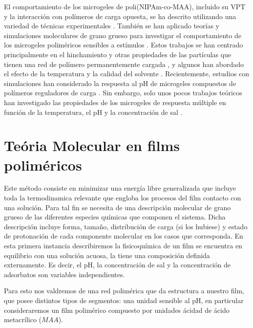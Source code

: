 El comportamiento de los microgeles de poli(NIPAm-co-MAA), incluido su VPT y la interacci\'on con pol\'imeros de carga opuesta, se ha descrito utilizando una variedad de t\'ecnicas experimentales \cite{Hoare2004,Dowding2000,Kleinen2008,Kleinen2010, Giussi2015, Su2016,Giussi2020}.
Tambi\'en se han aplicado teor\'ias  y simulaciones moleculares de grano grueso para investigar el comportamiento de los microgeles polim\'ericos sensibles a est\'imulos \cite{quesada2011gel,ahualli2016coarse,Landsgesell2019SM}.
Estos trabajos se han centrado principalmente en el hinchamiento y otras propiedades de las part\'iculas que tienen una red de pol\'imero permanentemente cargada , y algunos han abordado el efecto de la temperatura y la calidad del solvente \cite{Jha2011, QuesadaPerez2013, moncho-jorda2016a, ahualli2016coarse, AdroherBenitez2017PCCP}.
Recientemente, estudios  con simulaciones han considerado la respuesta al pH de microgeles compuestos de pol\'imeros reguladores de carga \cite{Schroeder2015,Rud2017,Sean2018, Hofzumahaus2018,Lu2019}.
Sin embargo, solo unos pocos trabajos te\'oricos han investigado las propiedades de los microgeles de respuesta m\'ultiple en funci\'on de la temperatura, el pH y la concentración de sal  \cite{CaprilesGonzalez2008,polotsky2013collapse}.



\section{Te\'oria Molecular en films polim\'ericos} \label{sec:film-teoria}


Este m\'etodo consiste en minimizar una energ\'ia libre generalizada que incluye toda la termodinamica relevante que engloba los procesos del film contacto con una soluci\'on.
Para tal fin se necesita de una descripci\'on molecular de grano grueso de las diferentes especies qu\'imicas que componen el sistema.
Dicha descripci\'on incluye forma, tama\~no, distribuci\'on de carga (si los hubiese) y estado de protonaci\'on de cada componente molecular en los casos que corresponda.
En esta primera instancia describiremos la fisicoqu\'imica de un film  se encuentra en  equilibrio con una solución acuosa, la tiene una composición  definida externamente.
Es decir, el pH, la concentración de sal y la concentraci\'on de adsorbatos son variables independientes.

Para esto nos valdremos de una  red polim\'erica que da estructura a nuestro film, que posee distintos tipos de segmentos: una unidad sensible al pH, en particular consideraremos un film polim\'erico compuesto por unidades \'acidad de \'acido metacr\'ilico ($MAA$).

